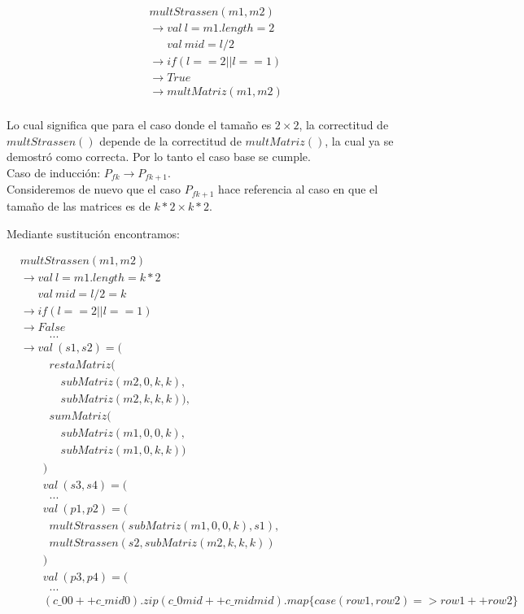 \documentclass{article}
\begin{document}
\begin{align*}
    &multStrassen(m1, m2)\\
    &\rightarrow val \ l = m1.length = 2\\
    &\quad \; \; val \ mid = l/2\\
    &\rightarrow if (l == 2 || l == 1)\\
    &\rightarrow True\\
    &\rightarrow multMatriz(m1,m2)\\
\end{align*}

Lo cual significa que para el caso donde el tamaño es \(2 \times 2\), la correctitud de \(multStrassen()\) depende de la correctitud de \(multMatriz()\), la cual ya se demostró como correcta. Por lo tanto el caso base se cumple. \\

Caso de inducción: \(P_{fk} \rightarrow P_{fk+1}\).\\

Consideremos de nuevo que el caso \(P_{fk+1}\) hace referencia al caso en que el tamaño de las matrices es de \(k*2 \times k*2\).

Mediante sustitución encontramos:

\begin{align*}
    &multStrassen(m1, m2)\\
    &\rightarrow val \ l = m1.length = k*2\\
    &\quad \; \; val \ mid = l/2 = k\\
    &\rightarrow if (l == 2 || l == 1)\\
    &\rightarrow False\\
    &\quad \quad \; \; . . .\\
    &\rightarrow val \ (s1, s2) = (\\
    &\quad \quad \; \;    restaMatriz(\\
    &\quad \quad \quad \; \;      subMatriz(m2, 0, k, k),\\
    &\quad \quad \quad \; \;      subMatriz(m2, k, k, k)),\\
    &\quad \quad \; \;    sumMatriz(\\
    &\quad \quad \quad \; \;      subMatriz(m1, 0, 0, k),\\
    &\quad \quad \quad \; \;      subMatriz(m1, 0, k, k))\\
    &\quad \quad  )\\
    &\quad \quad  val \ (s3, s4) = (\\
    &\quad \quad \; \; . . .\\
    &\quad \quad val \ (p1, p2) = (\\
    &\quad \quad \; \; multStrassen(subMatriz(m1, 0, 0, k), s1),\\
    &\quad \quad \; \; multStrassen(s2, subMatriz(m2, k, k, k))\\
    &\quad \quad  )\\
    &\quad \quad val \ (p3, p4) = (\\
    &\quad \quad \; \; . . .\\
    &\quad \quad  (c\_00 ++ c\_mid0).zip(c\_0mid ++ c\_midmid).map \{case (row1, row2) => row1 ++ row2\}\\
\end{align*}
\end{document}
